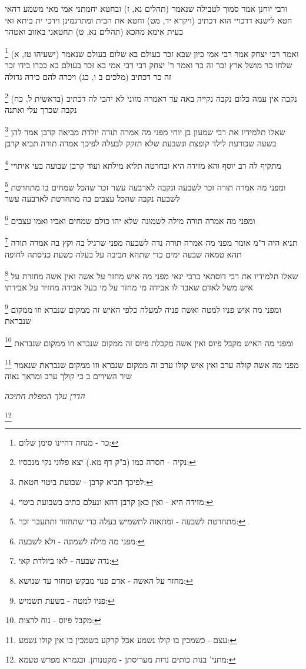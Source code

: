 \documentclass[12pt, openany]{book}
\newcommand{\footnotecomment}[1]{
	\renewcommand\thefootnote{}
	\footnote{#1}}
\newcommand{\commenta}[1]{\footnotecomment{#1}}
\begin{document}
{ורבי יוחנן אמר סמוך לטבילה שנאמר (תהלים נא, ז) ובחטא יחמתני אמי 
מאי משמע דהאי חטא לישנא דדכויי הוא דכתיב (ויקרא יד, מט) וחטא את הבית ומתרגמינן וידכי ית ביתא ואי בעית אימא מהכא (תהלים נא, ט) תחטאני באזוב ואטהר 
\commenta{כר - מנחה דהיינו סימן שלום:}
ואמר רבי יצחק אמר רבי אמי כיון שבא זכר בעולם בא שלום בעולם שנאמר (ישעיהו טז, א) שלחו כר מושל ארץ זכר זה כר 
ואמר ר' יצחק דבי רבי אמי בא זכר בעולם בא ככרו בידו זכר זה כר דכתיב (מלכים ב ו, כג) ויכרה להם כירה גדולה 
\commenta{נקיה - חסרה כמו (ב"ק דף מא.) יצא פלוני נקי מנכסיו:}
נקבה אין עמה כלום נקבה נקייה באה עד דאמרה מזוני לא יהבי לה דכתיב (בראשית ל, כח) נקבה שכרך עלי ואתנה 
\commenta{לפיכך תביא קרבן - שבועת ביטוי חטאת:}
שאלו תלמידיו את רבי שמעון בן יוחי מפני מה אמרה תורה יולדת מביאה קרבן אמר להן בשעה שכורעת לילד קופצת ונשבעת שלא תזקק לבעלה לפיכך אמרה תורה תביא קרבן 
\commenta{מזידה היא - ואין כאן קרבן דהא ונעלם כתיב בשבועת ביטוי:}
מתקיף לה רב יוסף והא מזידה היא ובחרטה תליא מילתא ועוד קרבן שבועה בעי איתויי 
\commenta{מתחרטת לשבעה - ומתאוה לתשמיש בעלה כדי שתחזור ותתעבר זכר:}
ומפני מה אמרה תורה זכר לשבעה ונקבה לארבעה עשר זכר שהכל שמחים בו מתחרטת לשבעה נקבה שהכל עצבים בה מתחרטת לארבעה עשר 
\commenta{מפני מה מילה לשמונה - ולא לשבעה:}
ומפני מה אמרה תורה מילה לשמונה שלא יהו כולם שמחים ואביו ואמו עצבים 
\commenta{נדה שבעה - לאו ביולדת קאי:}
תניא היה ר"מ אומר מפני מה אמרה תורה נדה לשבעה מפני שרגיל בה וקץ בה אמרה תורה תהא טמאה שבעה ימים כדי שתהא חביבה על בעלה כשעת כניסתה לחופה 
\commenta{מחזר על האשה - אדם פנוי מבקש ומחזר עד שנושא:}
שאלו תלמידיו את רבי דוסתאי ברבי ינאי מפני מה איש מחזר על אשה ואין אשה מחזרת על איש משל לאדם שאבד לו אבידה מי מחזר על מי בעל אבידה מחזיר על אבידתו 
\commenta{פניו למטה - בשעת תשמיש:}
ומפני מה איש פניו למטה ואשה פניה למעלה כלפי האיש זה ממקום שנברא וזו ממקום שנבראת 
\commenta{מקבל פיוס - נוח לרצות:}
ומפני מה האיש מקבל פיוס ואין אשה מקבלת פיוס זה ממקום שנברא וזו ממקום שנבראת 
\commenta{עצם - כשמכין בו קולו נשמע אבל קרקע כשמכין בו אין קולו נשמע:}
מפני מה אשה קולה ערב ואין איש קולו ערב זה ממקום שנברא וזו ממקום שנבראת שנאמר {שיר השירים ב } כי קולך ערב ומראך נאוה
\par \par {\large\emph{הדרן עלך המפלת חתיכה}}\par \par 
\commenta{מתני' בנות כותים נדות מעריסתן - מקטנותן. ובגמרא מפרש טעמא:}

}
\end{document}
